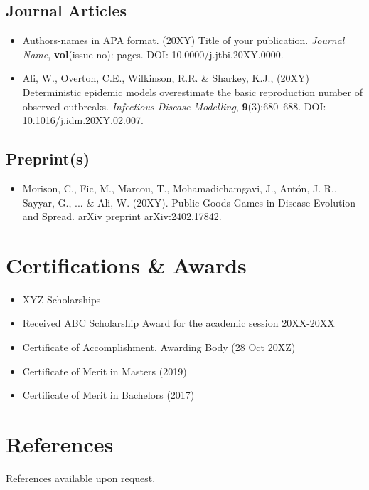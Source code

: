 \documentclass[11pt]{article}
\begin{document}
\subsection{Journal Articles}
\begin{itemize}
    \item[\checkmark] Authors-names in APA format. (20XY) Title of your publication. \textit{Journal Name}, \textbf{vol}(issue no): pages. DOI: 10.0000/j.jtbi.20XY.0000. %
    \item[\checkmark] Ali, W., Overton, C.E., Wilkinson, R.R. \& Sharkey, K.J., (20XY) Deterministic epidemic models overestimate the basic reproduction number of observed outbreaks. \textit{Infectious Disease Modelling}, \textbf{9}(3):680–688. DOI: 10.1016/j.idm.20XY.02.007.
\end{itemize}
\subsection{Preprint(s)}
\begin{itemize}
    \item[\checkmark] Morison, C., Fic, M., Marcou, T., Mohamadichamgavi, J., Antón, J. R., Sayyar, G., ... \& Ali, W. (20XY). Public Goods Games in Disease Evolution and Spread. arXiv preprint arXiv:2402.17842.
\end{itemize}
\section{Certifications \& Awards}
\begin{itemize}
    \item[\checkmark] XYZ Scholarships
    \item[\checkmark] Received ABC Scholarship Award for the academic session 20XX-20XX
    \item[\checkmark] Certificate of Accomplishment, Awarding Body (28 Oct 20XZ)
    \item[\checkmark] Certificate of Merit in Masters (2019)
    \item[\checkmark] Certificate of Merit in Bachelors (2017)
\end{itemize}
\section{References}
\textcolor{Sepia}{References available upon request.}
\end{document}

